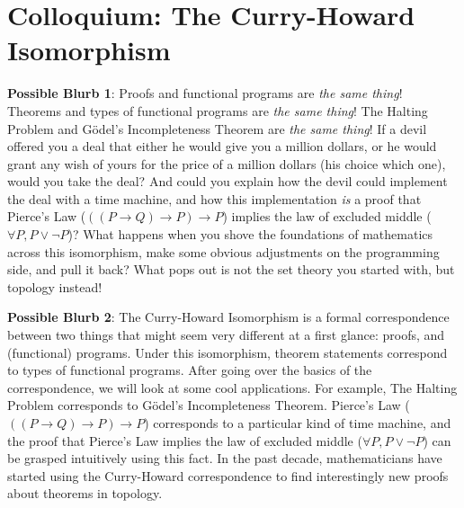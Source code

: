 \documentclass{article}
\begin{document}
\section*{Colloquium: The Curry-Howard Isomorphism}
\noindent \textbf{Possible Blurb 1}: Proofs and functional programs are \emph{the same thing}!  Theorems and types of functional programs are \emph{the same thing}!  The Halting Problem and G\"odel's Incompleteness Theorem are \emph{the same thing}!  If a devil offered you a deal that either he would give you a million dollars, or he would grant any wish of yours for the price of a million dollars (his choice which one), would you take the deal?  And could you explain how the devil could implement the deal with a time machine, and how this implementation \emph{is} a proof that Pierce's Law ($((P\to Q)\to P)\to P$) implies the law of excluded middle ($\forall P, P \vee \neg P$)?  What happens when you shove the foundations of mathematics across this isomorphism, make some obvious adjustments on the programming side, and pull it back?  What pops out is not the set theory you started with, but topology instead!

\noindent \textbf{Possible Blurb 2}: The Curry-Howard Isomorphism is a formal correspondence between two things that might seem very different at a first glance: proofs, and (functional) programs.  Under this isomorphism, theorem statements correspond to types of functional programs.  After going over the basics of the correspondence, we will look at some cool applications.  For example, The Halting Problem corresponds to G\"odel's Incompleteness Theorem.  Pierce's Law ($((P\to Q)\to P)\to P$) corresponds to a particular kind of time machine, and the proof that Pierce's Law implies the law of excluded middle ($\forall P, P \vee \neg P$) can be grasped intuitively using this fact.  In the past decade, mathematicians have started using the Curry-Howard correspondence to find interestingly new proofs about theorems in topology.
\end{document}
